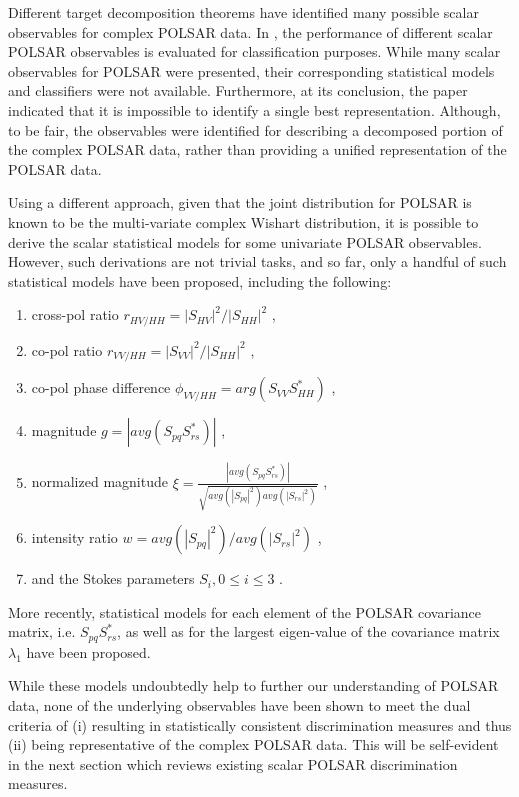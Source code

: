 \documentclass[journal]{IEEEtran}
\begin{document}
Different target decomposition theorems have identified many possible scalar observables for complex POLSAR data.
In \cite{Alberga_2008_IJRS_4129}, the performance of different scalar POLSAR observables is evaluated for classification purposes.
While many scalar observables for POLSAR were presented, their corresponding statistical models and classifiers were not available.
Furthermore, at its conclusion, the paper indicated that it is impossible to identify a single best representation.
Although, to be fair, the observables were identified for describing a decomposed portion of the complex POLSAR data,
  rather than providing a unified representation of the POLSAR data.

Using a different approach, given that the joint distribution for POLSAR is known to be the multi-variate complex Wishart distribution,
  it is possible to derive the scalar statistical models for some univariate POLSAR observables.
However, such derivations are not trivial tasks, and so far, only a handful of such statistical models have been proposed, including the following:
  \begin{enumerate}
  \item cross-pol ratio $r_{HV/HH} = |S_{HV}|^2/|S_{HH}|^2$ \cite{Joughin_1994_TGRS_562},
  \item co-pol ratio $r_{VV/HH} = |S_{VV}|^2/|S_{HH}|^2$ \cite{Joughin_1994_TGRS_562},
  \item co-pol phase difference $\phi_{VV/HH} = arg(S_{VV}S_{HH}^*) $ \cite{Joughin_1994_TGRS_562} \cite{Lee_1994_TGRS_1017},
  \item magnitude $g=|avg(S_{pq}S_{rs}^*)|$ \cite{Lee_1994_TGRS_1017},
  \item normalized magnitude $\xi = \frac{|avg(S_{pq}S_{rs}^*)|}{\sqrt{avg(|S_{pq}|^2) avg(|S_{rs}|^2)}}$ \cite{Lee_1994_TGRS_1017},
  \item intensity ratio $w = avg(|S_{pq}|^2)/avg(|S_{rs}|^2)$ \cite{Lee_1994_TGRS_1017},
  \item and the Stokes parameters $S_i,0 \leq i \leq 3$ \cite{Touzi_1996_TGRS_519}. 
  \end{enumerate}
More recently, statistical models for
  each element of the POLSAR covariance matrix, i.e. $S_{pq}S_{rs}^*$, \cite{Lopez-Martinez_2003_TGRS_2232}
  as well as for the largest eigen-value of the covariance matrix $\lambda_1$ \cite{Erten_2012_Sensors_2766} have been proposed.

While these models undoubtedly help to further our understanding of POLSAR data,
  none of the underlying observables have been shown to meet the dual criteria of
  (i) resulting in statistically consistent discrimination measures and thus 
  (ii) being representative of the complex POLSAR data.
This will be self-evident in the next section 
  which reviews existing scalar POLSAR discrimination measures.
\end{document}
